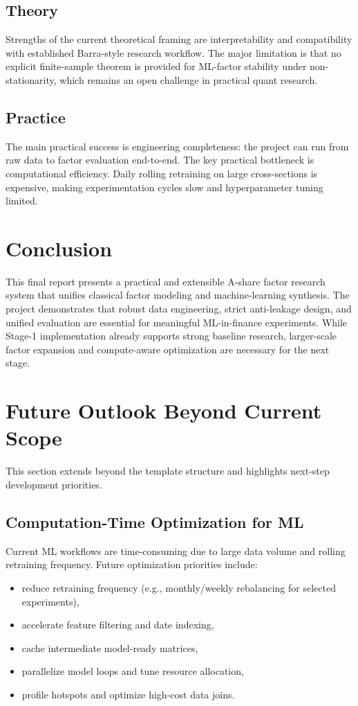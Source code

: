 \documentclass[letterpaper,11pt]{article}
\begin{document}
\subsection{Theory}
Strengths of the current theoretical framing are interpretability and compatibility with established Barra-style research workflow. The major limitation is that no explicit finite-sample theorem is provided for ML-factor stability under non-stationarity, which remains an open challenge in practical quant research.

\subsection{Practice}
The main practical success is engineering completeness: the project can run from raw data to factor evaluation end-to-end. The key practical bottleneck is computational efficiency. Daily rolling retraining on large cross-sections is expensive, making experimentation cycles slow and hyperparameter tuning limited.

\section{Conclusion}
This final report presents a practical and extensible A-share factor research system that unifies classical factor modeling and machine-learning synthesis. The project demonstrates that robust data engineering, strict anti-leakage design, and unified evaluation are essential for meaningful ML-in-finance experiments. While Stage-1 implementation already supports strong baseline research, larger-scale factor expansion and compute-aware optimization are necessary for the next stage.

\section{Future Outlook Beyond Current Scope}
This section extends beyond the template structure and highlights next-step development priorities.

\subsection{Computation-Time Optimization for ML}
Current ML workflows are time-consuming due to large data volume and rolling retraining frequency. Future optimization priorities include:
\begin{itemize}
    \item reduce retraining frequency (e.g., monthly/weekly rebalancing for selected experiments),
    \item accelerate feature filtering and date indexing,
    \item cache intermediate model-ready matrices,
    \item parallelize model loops and tune resource allocation,
    \item profile hotspots and optimize high-cost data joins.
\end{itemize}
\end{document}
